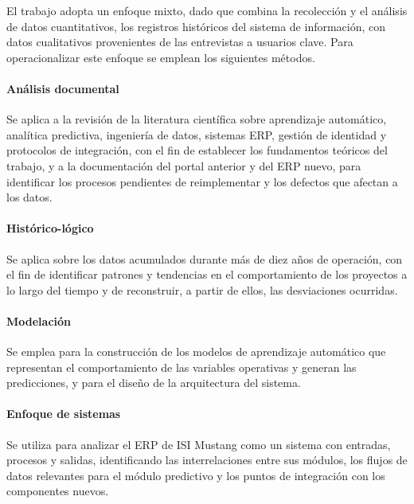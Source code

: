 El trabajo adopta un enfoque mixto, dado que combina la recolección y el análisis de datos cuantitativos, los registros históricos del sistema de información, con datos cualitativos provenientes de las entrevistas a usuarios clave. Para operacionalizar este enfoque se emplean los siguientes métodos.

\paragraph{Análisis documental}

Se aplica a la revisión de la literatura científica sobre aprendizaje automático, analítica predictiva, ingeniería de datos, sistemas ERP, gestión de identidad y protocolos de integración, con el fin de establecer los fundamentos teóricos del trabajo, y a la documentación del portal anterior y del ERP nuevo, para identificar los procesos pendientes de reimplementar y los defectos que afectan a los datos.

\paragraph{Histórico-lógico}

Se aplica sobre los datos acumulados durante más de diez años de operación, con el fin de identificar patrones y tendencias en el comportamiento de los proyectos a lo largo del tiempo y de reconstruir, a partir de ellos, las desviaciones ocurridas.

\paragraph{Modelación}

Se emplea para la construcción de los modelos de aprendizaje automático que representan el comportamiento de las variables operativas y generan las predicciones, y para el diseño de la arquitectura del sistema.

\paragraph{Enfoque de sistemas}

Se utiliza para analizar el ERP de ISI Mustang como un sistema con entradas, procesos y salidas, identificando las interrelaciones entre sus módulos, los flujos de datos relevantes para el módulo predictivo y los puntos de integración con los componentes nuevos.

